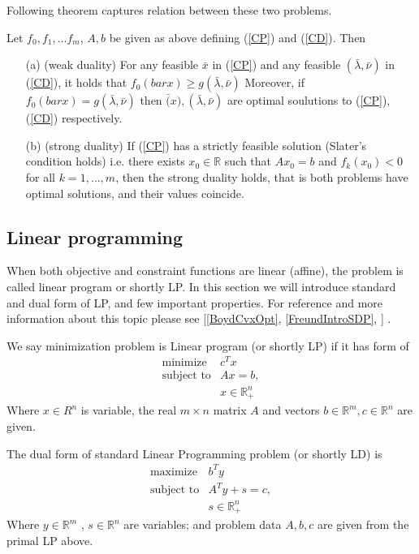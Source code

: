 \documentclass[10pt,oneside]{book}
\theoremstyle{definition}
\begin{document}
Following theorem captures relation between these two problems.
{\thm \label{StrongDualityCP}
Let $f_0, f_1,\dots f_m$, $A,b$ be given as above defining (\ref{CP}) and (\ref{CD}). Then 
\begin{enumerate}
\item[\rm (a)] (weak duality)  For any feasible $\bar{x}$ in (\ref{CP}) and any feasible $(\bar{\lambda}, \bar{\nu})$ in (\ref{CD}), it holds that $f_0(bar{x})\geq g(\bar{\lambda}, \bar{\nu})$  Moreover, if $f_0(bar{x}) = g(\bar{\lambda}, \bar{\nu})$  then $\bar(x), (\bar{\lambda}, \bar{\nu})$ are optimal soulutions to (\ref{CP}), (\ref{CD}) respectively.
\item[\rm (b)] (strong duality) If (\ref{CP}) has a strictly feasible solution (Slater's condition holds) i.e. there exists $x_0\in \mathbb{R}$ such that $Ax_0 = b$ and $f_k(x_0)<0$ for all $k = 1,\dots ,m$, then the strong duality holds, that is both problems have optimal solutions, and their values coincide.
\end{enumerate}
}



\subsection{Linear programming}

When both objective and constraint functions are linear (affine), the problem is called linear program or shortly LP.
In this section we will introduce standard and dual form of LP, and few important properties. For reference and more information about this topic please see [\ref{BoydCvxOpt}, \ref{FreundIntroSDP},  ] .

\label{defLP}
We say minimization problem is Linear program (or shortly LP) if it has form of 
\begin{equation}
\label{LP} 
\begin{array}{ll}
\mbox{minimize} & c^Tx \\
\mbox{subject to}& Ax = b ,  \\
& x \in \mathbb{R}^n_+
\end{array} 
\tag{LP}
\end{equation}
Where $x\in R^n$ is variable, the real $m\times n$ matrix $A$ and vectors $b \in \mathbb{R}^m, c\in \mathbb{R}^n$ are given.

\bigskip

The dual form of standard Linear Programming problem (or shortly LD) is 
\begin{equation}
\label{LD} 
\begin{array}{ll}
\mbox{maximize} & b^Ty \\
\mbox{subject to}& A^Ty +s = c ,  \\
& s\in \mathbb{R}^n_+
\end{array} 
\tag{LD}
\end{equation}
Where $y\in \mathbb{R}^m$ , $s\in \mathbb{R}^n$ are variables; and problem data $A,b,c$ are given from the primal LP above.
\bigskip
\end{document}
